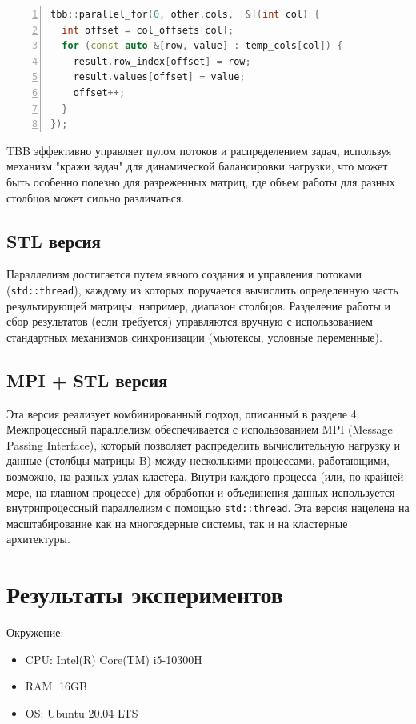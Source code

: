 \documentclass[12pt]{article}
\begin{document}
\begin{lstlisting}[language=C++, numbers=left]
tbb::parallel_for(0, other.cols, [&](int col) {
  int offset = col_offsets[col];
  for (const auto &[row, value] : temp_cols[col]) {
    result.row_index[offset] = row;
    result.values[offset] = value;
    offset++;
  }
});
\end{lstlisting}

TBB эффективно управляет пулом потоков и распределением задач, используя механизм "кражи задач" для динамической балансировки нагрузки, что может быть особенно полезно для разреженных матриц, где объем работы для разных столбцов может сильно различаться.

\subsection{STL версия}
Параллелизм достигается путем явного создания и управления потоками (\lstinline{std::thread}), каждому из которых поручается вычислить определенную часть результирующей матрицы, например, диапазон столбцов. Разделение работы и сбор результатов (если требуется) управляются вручную с использованием стандартных механизмов синхронизации (мьютексы, условные переменные).

\subsection{MPI + STL версия}
Эта версия реализует комбинированный подход, описанный в разделе 4. Межпроцессный параллелизм обеспечивается с использованием MPI (Message Passing Interface), который позволяет распределить вычислительную нагрузку и данные (столбцы матрицы B) между несколькими процессами, работающими, возможно, на разных узлах кластера. Внутри каждого процесса (или, по крайней мере, на главном процессе) для обработки и объединения данных используется внутрипроцессный параллелизм с помощью \lstinline{std::thread}. Эта версия нацелена на масштабирование как на многоядерные системы, так и на кластерные архитектуры.
\newpage

\section{Результаты экспериментов}
Окружение:
\begin{itemize}
    \item CPU: Intel(R) Core(TM) i5-10300H
    \item RAM: 16GB
    \item OS: Ubuntu 20.04 LTS
\end{itemize}
\end{document}

